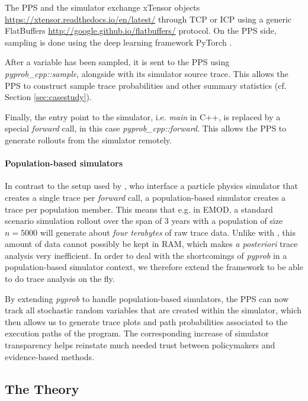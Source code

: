 \documentclass{article}
\begin{document}
The PPS and the simulator exchange xTensor objects \url{https://xtensor.readthedocs.io/en/latest/} through TCP or ICP using a generic FlatBuffers \url{http://google.github.io/flatbuffers/} protocol. On the PPS side, sampling is done using the deep learning framework PyTorch \cite{paszke2017automatic}.

After a variable has been sampled, it is sent to the PPS using \textit{pyprob\_cpp::sample}, alongside with its simulator source trace. This allows the PPS to construct sample trace probabilities and other summary statistics (cf. Section \ref{sec:casestudy}). 

Finally, the entry point to the simulator, i.e. \textit{main} in C++, is replaced by a special \textit{forward} call, in this case \textit{pyprob\_cpp::forward}.
This allows the PPS to generate rollouts from the simulator remotely. 

\paragraph{Population-based simulators} In contrast to the setup used by \cite{baydin2018efficient}, who interface a particle physics simulator that creates a single trace per \textit{forward} call, a population-based simulator creates a trace per population member. This means that e.g. in EMOD, a standard scenario simulation rollout over the span of $3$ years  
with a population of size $n=5000$ \cite{smith2008towards} will generate about \textit{four terabytes} of raw trace data. Unlike with \citep{baydin2018efficient}, this amount of data cannot possibly be kept in RAM, which makes \textit{a posteriori} trace analysis very inefficient. 
In order to deal with the shortcomings of \textit{pyprob} in a population-based simulator context, we therefore extend the framework to be able to do trace analysis on the fly.

By extending \textit{pyprob} to handle population-based simulators, the PPS can now track all stochastic random variables that are created within the simulator, which then allows us to generate trace plots and path probabilities associated to the execution paths of the program.
The corresponding increase of simulator transparency helps reinstate much needed trust between policymakers and evidence-based methods.

\subsection{The Theory}
\end{document}
